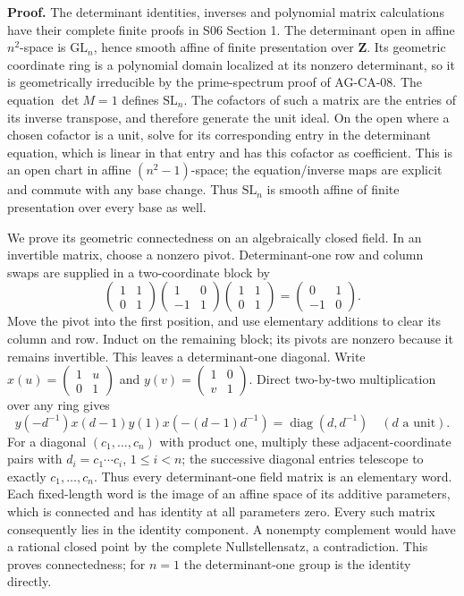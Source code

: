 \documentclass[11pt,a4paper,openany]{report}
\newcounter{none}
\begin{document}
\textbf{Proof.} The determinant identities, inverses and polynomial matrix calculations have their complete finite proofs in S06 Section 1. The determinant open in affine \(n^2\)-space is \(\mathrm{GL}_n\), hence smooth affine of finite presentation over \(\mathbf Z\). Its geometric coordinate ring is a polynomial domain localized at its nonzero determinant, so it is geometrically irreducible by the prime-spectrum proof of AG-CA-08. The equation \(\det M=1\) defines \(\mathrm{SL}_n\). The cofactors of such a matrix are the entries of its inverse transpose, and therefore generate the unit ideal. On the open where a chosen cofactor is a unit, solve for its corresponding entry in the determinant equation, which is linear in that entry and has this cofactor as coefficient. This is an open chart in affine \((n^2-1)\)-space; the equation/inverse maps are explicit and commute with any base change. Thus \(\mathrm{SL}_n\) is smooth affine of finite presentation over every base as well.

We prove its geometric connectedness on an algebraically closed field. In an invertible matrix, choose a nonzero pivot. Determinant-one row and column swaps are supplied in a two-coordinate block by \[
 \begin{pmatrix}1&1\\0&1\end{pmatrix}
 \begin{pmatrix}1&0\\-1&1\end{pmatrix}
 \begin{pmatrix}1&1\\0&1\end{pmatrix}
 =\begin{pmatrix}0&1\\-1&0\end{pmatrix}.
\] Move the pivot into the first position, and use elementary additions to clear its column and row. Induct on the remaining block; its pivots are nonzero because it remains invertible. This leaves a determinant-one diagonal. Write \(x(u)=\left(\begin{smallmatrix}1&u\\0&1\end{smallmatrix}\right)\) and \(y(v)=\left(\begin{smallmatrix}1&0\\v&1\end{smallmatrix}\right)\). Direct two-by-two multiplication over any ring gives \[
 y(-d^{-1})x(d-1)y(1)x(-(d-1)d^{-1})
   =\operatorname{diag}(d,d^{-1})\quad(d\text{ a unit}).
\] For a diagonal \((c_1,\ldots,c_n)\) with product one, multiply these adjacent-coordinate pairs with \(d_i=c_1\cdots c_i\), \(1\le i<n\); the successive diagonal entries telescope to exactly \(c_1,\ldots,c_n\). Thus every determinant-one field matrix is an elementary word. Each fixed-length word is the image of an affine space of its additive parameters, which is connected and has identity at all parameters zero. Every such matrix consequently lies in the identity component. A nonempty complement would have a rational closed point by the complete Nullstellensatz, a contradiction. This proves connectedness; for \(n=1\) the determinant-one group is the identity directly.
\end{document}
